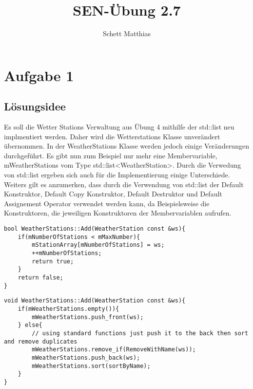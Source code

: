 \documentclass[a4paper,oneside,openany]{tufte-book}
\author{Schett Matthias}
\title{SEN-\"{U}bung 2.7}
\begin{document}


\frontmatter

\maketitle
\tableofcontents
\mainmatter

\chapter{Aufgabe 1}

\section{L\"{o}sungsidee}

Es soll die Wetter Stations Verwaltung aus Übung 4 mithilfe der std::list neu implmentiert werden. Daher wird die Wetterstations Klasse unverändert übernommen.
In der WeatherStations Klasse werden jedoch einige Veränderungen durchgeführt.
Es gibt nun zum Beispiel nur mehr eine Membervariable, mWeatherStations vom Type std::list<WeatherStation>.
Durch die Verwedung von std::list ergeben sich auch für die Implementierung einige Unterschiede.
Weiters gilt es anzumerken, dass durch die Verwendung von std::list der Default Konstruktor, Default Copy Konstruktor, Default Destruktor und Default Assignement Operator 
verwendet werden kann, da Beispielsweise die Konstruktoren, die jeweiligen Konstruktoren der Membervariablen aufrufen.

\begin{fullwidth} \begin{lstlisting}[caption=Alte Implementierung Add]
bool WeatherStations::Add(WeatherStation const &ws){
    if(mNumberOfStations < mMaxNumber){
        mStationArray[mNumberOfStations] = ws;
        ++mNumberOfStations;
        return true;
    }
    return false;
}
\end{lstlisting} \end{fullwidth}

\begin{fullwidth} \begin{lstlisting}[caption=Neue Implementierung Add]
void WeatherStations::Add(WeatherStation const &ws){
    if(mWeatherStations.empty()){
        mWeatherStations.push_front(ws);
    } else{
        // using standard functions just push it to the back then sort and remove duplicates
        mWeatherStations.remove_if(RemoveWithName(ws));
        mWeatherStations.push_back(ws);
        mWeatherStations.sort(sortByName);
    }
}
\end{lstlisting} \end{fullwidth}
\end{document}
